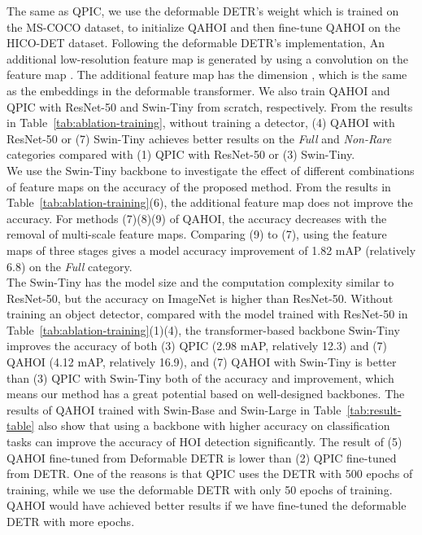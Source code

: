 \documentclass[10pt,twocolumn,letterpaper]{article}
\begin{document}
\space The same as QPIC, we use the deformable DETR's weight which is trained on the MS-COCO dataset, to initialize QAHOI and then fine-tune QAHOI on the HICO-DET dataset.
Following the deformable DETR's implementation,
An additional low-resolution feature map  is generated
by using a  convolution on the feature map .
The additional feature map  has the dimension , which is the same as the embeddings in the deformable transformer.
We also train QAHOI and QPIC with ResNet-50 and Swin-Tiny from scratch, respectively.
From the results in Table~\ref{tab:ablation-training}, without training a detector, (4) QAHOI with ResNet-50 or (7) Swin-Tiny achieves better results on the {\em Full} and {\em Non-Rare} categories compared with (1) QPIC with ResNet-50 or (3) Swin-Tiny.
\\
\space We use the Swin-Tiny backbone to investigate the effect of different combinations of feature maps on the accuracy of the proposed method.
From the results in Table~\ref{tab:ablation-training}(6), the additional feature map does not improve the accuracy. 
For methods (7)(8)(9) of QAHOI, the accuracy decreases with the removal of multi-scale feature maps.
Comparing (9) to (7), using the feature maps of three stages gives a model accuracy improvement of 1.82 mAP (relatively 6.8) on the {\em Full} category.
\\
\space The Swin-Tiny has the model size and the computation complexity similar to ResNet-50, but the accuracy on ImageNet is higher than ResNet-50.
Without training an object detector, compared with the model trained with ResNet-50 in Table~\ref{tab:ablation-training}(1)(4), the transformer-based backbone Swin-Tiny improves the accuracy of both (3) QPIC (2.98 mAP, relatively 12.3) and (7) QAHOI (4.12 mAP, relatively 16.9), and (7) QAHOI with Swin-Tiny is better than (3) QPIC with Swin-Tiny both of the accuracy and improvement, which means our method has a great potential based on well-designed backbones.
The results of QAHOI trained with Swin-Base and Swin-Large in Table~\ref{tab:result-table} also show that using a backbone with higher accuracy on classification tasks can improve the accuracy of HOI detection significantly.
The result of (5) QAHOI fine-tuned from Deformable DETR is lower than (2) QPIC fine-tuned from DETR. 
One of the reasons is that QPIC uses the DETR with 500 epochs of training, while we use the deformable DETR with only 50 epochs of training. 
QAHOI would have achieved better results if we have fine-tuned the deformable DETR with more epochs.
\end{document}
